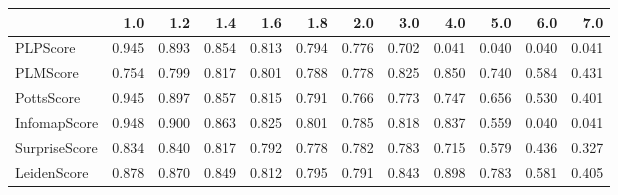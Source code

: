 \begin{tabular}{lrrrrrrrrrrr}
\toprule
{} &   1.0 &   1.2 &   1.4 &   1.6 &   1.8 &   2.0 &   3.0 &   4.0 &   5.0 &   6.0 &   7.0 \\
\midrule
PLPScore      & 0.945 & 0.893 & 0.854 & 0.813 & 0.794 & 0.776 & 0.702 & 0.041 & 0.040 & 0.040 & 0.041 \\
PLMScore      & 0.754 & 0.799 & 0.817 & 0.801 & 0.788 & 0.778 & 0.825 & 0.850 & 0.740 & 0.584 & 0.431 \\
PottsScore    & 0.945 & 0.897 & 0.857 & 0.815 & 0.791 & 0.766 & 0.773 & 0.747 & 0.656 & 0.530 & 0.401 \\
InfomapScore  & 0.948 & 0.900 & 0.863 & 0.825 & 0.801 & 0.785 & 0.818 & 0.837 & 0.559 & 0.040 & 0.041 \\
SurpriseScore & 0.834 & 0.840 & 0.817 & 0.792 & 0.778 & 0.782 & 0.783 & 0.715 & 0.579 & 0.436 & 0.327 \\
LeidenScore   & 0.878 & 0.870 & 0.849 & 0.812 & 0.795 & 0.791 & 0.843 & 0.898 & 0.783 & 0.581 & 0.405 \\
\bottomrule
\end{tabular}
